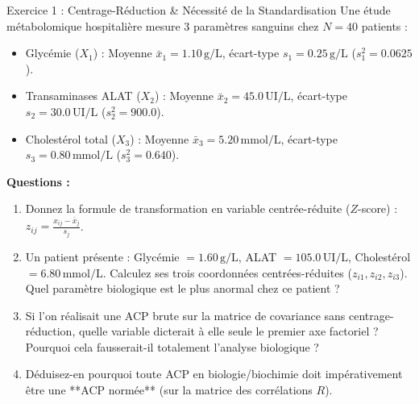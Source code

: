 \documentclass[11pt,a4paper]{article}
\begin{document}

\begin{exercicebox}{Exercice 1 : Centrage-Réduction \& Nécessité de la Standardisation}
Une étude métabolomique hospitalière mesure 3 paramètres sanguins chez $N = 40$ patients :
\begin{itemize}
  \item Glycémie ($X_1$) : Moyenne $\bar{x}_1 = 1.10\,\text{g/L}$, écart-type $s_1 = 0.25\,\text{g/L}$ ($s_1^2 = 0.0625$).
  \item Transaminases ALAT ($X_2$) : Moyenne $\bar{x}_2 = 45.0\,\text{UI/L}$, écart-type $s_2 = 30.0\,\text{UI/L}$ ($s_2^2 = 900.0$).
  \item Cholestérol total ($X_3$) : Moyenne $\bar{x}_3 = 5.20\,\text{mmol/L}$, écart-type $s_3 = 0.80\,\text{mmol/L}$ ($s_3^2 = 0.640$).
\end{itemize}

\textbf{Questions :}
\begin{enumerate}[label=\textbf{\alph*.}]
  \item Donnez la formule de transformation en variable centrée-réduite ($Z$-score) : $z_{ij} = \frac{x_{ij} - \bar{x}_j}{s_j}$.
  \item Un patient présente : Glycémie $= 1.60\,\text{g/L}$, ALAT $= 105.0\,\text{UI/L}$, Cholestérol $= 6.80\,\text{mmol/L}$. Calculez ses trois coordonnées centrées-réduites ($z_{i1}, z_{i2}, z_{i3}$). Quel paramètre biologique est le plus anormal chez ce patient ?
  \item Si l'on réalisait une ACP brute sur la matrice de covariance sans centrage-réduction, quelle variable dicterait à elle seule le premier axe factoriel ? Pourquoi cela fausserait-il totalement l'analyse biologique ?
  \item Déduisez-en pourquoi toute ACP en biologie/biochimie doit impérativement être une **ACP normée** (sur la matrice des corrélations $R$).
\end{enumerate}
\end{exercicebox}
\end{document}
